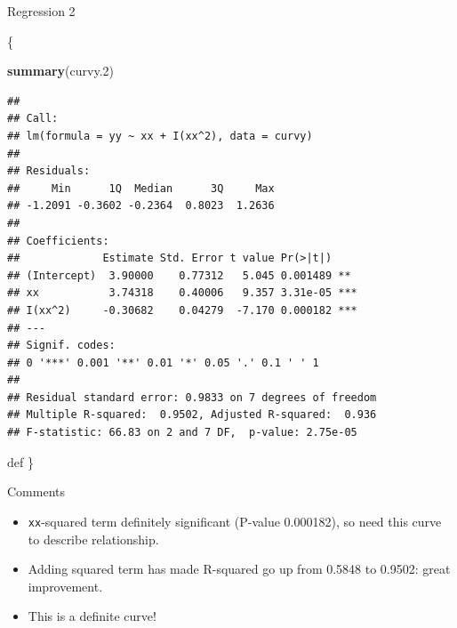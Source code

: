 \documentclass[ignorenonframetext,]{beamer}
\newenvironment{Shaded}{\begin{snugshade}}{\end{snugshade}}
\newcommand{\FloatTok}[1]{\textcolor[rgb]{0.00,0.00,0.81}{#1}}
\newcommand{\KeywordTok}[1]{\textcolor[rgb]{0.13,0.29,0.53}{\textbf{#1}}}
\newcommand{\NormalTok}[1]{#1}
\begin{document}
\begin{frame}[fragile]{Regression 2}
\protect\hypertarget{regression-2}{}

\{\scriptsize

\begin{Shaded}
\begin{Highlighting}[]
\KeywordTok{summary}\NormalTok{(curvy}\FloatTok{.2}\NormalTok{)}
\end{Highlighting}
\end{Shaded}

\begin{verbatim}
## 
## Call:
## lm(formula = yy ~ xx + I(xx^2), data = curvy)
## 
## Residuals:
##     Min      1Q  Median      3Q     Max 
## -1.2091 -0.3602 -0.2364  0.8023  1.2636 
## 
## Coefficients:
##             Estimate Std. Error t value Pr(>|t|)    
## (Intercept)  3.90000    0.77312   5.045 0.001489 ** 
## xx           3.74318    0.40006   9.357 3.31e-05 ***
## I(xx^2)     -0.30682    0.04279  -7.170 0.000182 ***
## ---
## Signif. codes:  
## 0 '***' 0.001 '**' 0.01 '*' 0.05 '.' 0.1 ' ' 1
## 
## Residual standard error: 0.9833 on 7 degrees of freedom
## Multiple R-squared:  0.9502, Adjusted R-squared:  0.936 
## F-statistic: 66.83 on 2 and 7 DF,  p-value: 2.75e-05
\end{verbatim}

def \}

\end{frame}

\begin{frame}[fragile]{Comments}
\protect\hypertarget{comments-1}{}

\begin{itemize}
\item
  \texttt{xx}-squared term definitely significant (P-value 0.000182), so
  need this curve to describe relationship.
\item
  Adding squared term has made R-squared go up from 0.5848 to 0.9502:
  great improvement.
\item
  This is a definite curve!
\end{itemize}

\end{frame}
\end{document}

